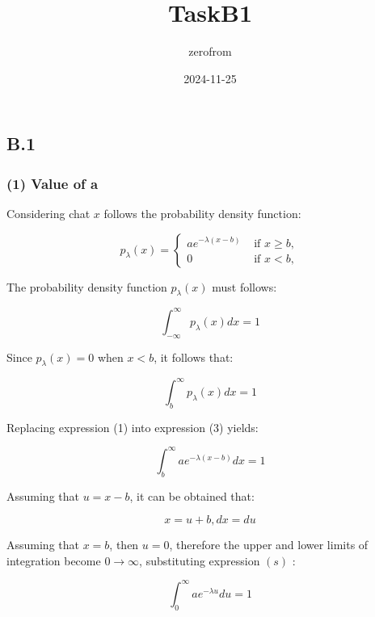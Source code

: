 \documentclass[
]{article}
\title{TaskB1}
\author{zerofrom}
\date{2024-11-25}
\begin{document}
\maketitle

\subsection{B.1}\label{b.1}

\subsubsection{(1) Value of a}\label{value-of-a}

Considering chat \(x\) follows the probability density function:

\[
p_{\lambda}(x)= \begin{cases}a e^{-\lambda(x-b)} & \text { if } x \geqslant b,  \tag{1}\\ 0 & \text { if } x<b,\end{cases}
\]

The probability density function \(p_{\lambda}(x)\) must follows:

\[
\begin{equation}
\int_{-\infty}^{\infty} p_{\lambda}(x) d x=1 \tag{2}
\end{equation}
\]

Since \(p_{\lambda}(x)=0\) when \(x<b\), it follows that:

\[
\begin{equation}
\int_{b}^{\infty} p_{\lambda}(x) d x=1 \tag{3}
\end{equation}
\]

Replacing expression (1) into expression (3) yields:

\[
\begin{equation}
\int_{b}^{\infty} a e^{-\lambda(x-b)} d x=1 \tag{4}
\end{equation}
\]

Assuming that \(u=x-b\), it can be obtained that:

\[
\begin{equation}
x=u+b, d x=d u \tag{5}
\end{equation}
\]

Assuming that \(x=b\), then \(u=0\), therefore the upper and lower
limits of integration become \(0 \rightarrow \infty\), substituting
expression \((s)\) :

\[
\begin{equation}
\int_{0}^{\infty} a e^{-\lambda u} d u=1 \tag{6}
\end{equation}
\]
\end{document}
